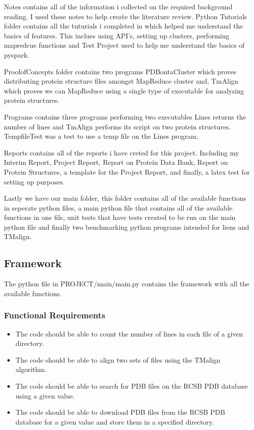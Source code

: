 \documentclass[]{final_report}
\begin{document}
Notes contains all of the information i collected on the required background reading. I used these notes to help create the literature review. Python Tutorials folder contains all the tuturials i completed in which helped me understand the basics of features. This inclues using API's, setting up clusters, performing mapredcue functions and Test Project used to help me understand the basics of pyspark.

ProofofConcepts folder contains two programs PDBontaCluster which proves distributing protein structure files amongst MapReduce cluster and, TmAlign which proves we can MapReduce using a single type of executable for analysing protein structures.

Programs contains three programs performing two executables Lines returns the number of lines and TmAlign performs its script on two protein structures. TempfileTest was a test to use a temp file on the Lines program.

Reports contains all of the reports i have creted for this project. Including my Interim Report, Project Report, Report on Protein Data Bank, Report on Protein Structures, a template for the Project Report, and finally, a latex test for setting up purposes.

Lastly we have our main folder, this folder contains all of the available functions in seperate python files, a main python file that contains all of the available functions in one file, unit tests that have tests created to be run on the main python file and finally two benchmarking python programs intended for liens and TMalign.

\subsection{Framework}
The python file in PROJECT/main/main.py contains the framework with all the available functions.

\subsubsection{Functional Requirements}

\begin{itemize}
    \item The code should be able to count the number of lines in each file of a given directory.
    \item The code should be able to align two sets of files using the TMalign algorithm.
    \item The code should be able to search for PDB files on the RCSB PDB database using a given value.
    \item The code should be able to download PDB files from the RCSB PDB database for a given value and store them in a specified directory.
\end{itemize}
\end{document}
